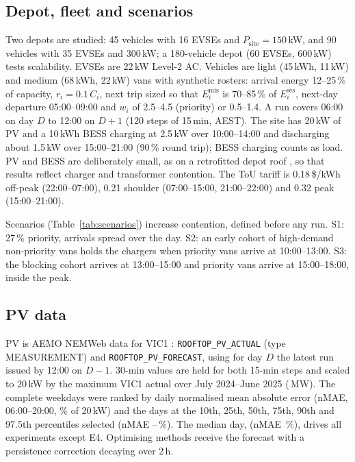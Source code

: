 \documentclass[preprint,12pt]{elsarticle}
\newcommand{\Ses}{E^{\mathrm{ses}}}
\newcommand{\Mis}{E^{\mathrm{mis}}}
\newcommand{\Psite}{P_{\mathrm{site}}}
\begin{document}
\subsection{Depot, fleet and scenarios}
Two depots are studied: 45 vehicles with 16 EVSEs and $\Psite=150$\,kW, and 90 vehicles with 35 EVSEs and
300\,kW; a 180-vehicle depot (60 EVSEs, 600\,kW) tests scalability. EVSEs are 22\,kW Level-2 AC. Vehicles are
light (45\,kWh, 11\,kW) and medium (68\,kWh, 22\,kW) vans \cite{vales2026emergent,fiori2018modelling} with
synthetic rosters: arrival energy 12--25\,\% of capacity, $r_i=0.1\,C_i$, next trip sized so that $\Mis_i$ is
70--85\,\% of $\Ses_i$, next-day departure 05:00--09:00 and $w_i$ of 2.5--4.5 (priority) or 0.5--1.4. A run
covers 06:00 on day $D$ to 12:00 on $D+1$ (120 steps of 15\,min, AEST). The site has 20\,kW of PV and a
10\,kWh BESS charging at 2.5\,kW over 10:00--14:00 and discharging about 1.5\,kW over 15:00--21:00 (90\,\%
round trip); BESS charging counts as load. PV and BESS are deliberately small, as on a retrofitted depot roof
\cite{ratnam2015scheduling,teng2020technical}, so that results reflect charger and transformer contention.
The ToU tariff \cite{nimalsiri2021coordinated} is 0.18\,\$/kWh off-peak (22:00--07:00), 0.21 shoulder
(07:00--15:00, 21:00--22:00) and 0.32 peak (15:00--21:00).

Scenarios (Table~\ref{tab:scenarios}) increase contention, defined before any run. S1: 27\,\% priority,
arrivals spread over the day. S2: an early cohort of high-demand non-priority vans holds the chargers when
priority vans arrive at 10:00--13:00. S3: the blocking cohort arrives at 13:00--15:00 and priority vans arrive
at 15:00--18:00, inside the peak.



\subsection{PV data}
PV is AEMO NEMWeb data for VIC1 \cite{aemo2025mms}: \texttt{ROOFTOP\_PV\_ACTUAL} (type MEASUREMENT) and
\texttt{ROOFTOP\_PV\_FORECAST}, using for day $D$ the latest run issued by 12:00 on $D-1$. 30-min values are
held for both 15-min steps and scaled to 20\,kW by the maximum VIC1 actual over July 2024--June 2025
(\RPVNormMW\,MW). The \RCandidateDays{} complete weekdays were ranked by daily normalised mean absolute error
(nMAE, 06:00--20:00, \% of 20\,kW) and the days at the 10th, 25th, 50th, 75th, 90th and 97.5th percentiles
selected (nMAE \RNmaeMin--\RNmaeMax\,\%). The median day, \RPVRefDate{} (nMAE \RPVRefNmae\,\%), drives all
experiments except E4. Optimising methods receive the forecast with a persistence correction decaying over
2\,h.
\end{document}
